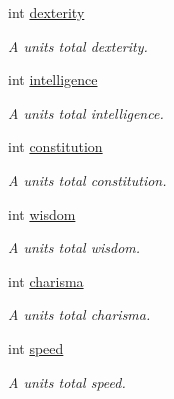 \begin{DoxyCompactItemize}
int \mbox{\hyperlink{class_attributes_ab0d80932c197709933e76e1a9faefcca}{dexterity}}
\begin{DoxyCompactList}\small\item\em A unit\textquotesingle{}s total dexterity. \end{DoxyCompactList}\item 
int \mbox{\hyperlink{class_attributes_a39014acfca0b4d854c675663a05b067e}{intelligence}}
\begin{DoxyCompactList}\small\item\em A unit\textquotesingle{}s total intelligence. \end{DoxyCompactList}\item 
int \mbox{\hyperlink{class_attributes_a5788ff85cda31bb47f02aa274d330523}{constitution}}
\begin{DoxyCompactList}\small\item\em A unit\textquotesingle{}s total constitution. \end{DoxyCompactList}\item 
int \mbox{\hyperlink{class_attributes_a48ec0beacd46bb9b9e206becde146d69}{wisdom}}
\begin{DoxyCompactList}\small\item\em A unit\textquotesingle{}s total wisdom. \end{DoxyCompactList}\item 
int \mbox{\hyperlink{class_attributes_ae5bf0d1820af23239997da36705a7295}{charisma}}
\begin{DoxyCompactList}\small\item\em A unit\textquotesingle{}s total charisma. \end{DoxyCompactList}\item 
int \mbox{\hyperlink{class_attributes_aa67231ed5d1163506d8d2d559a98e125}{speed}}
\begin{DoxyCompactList}\small\item\em A unit\textquotesingle{}s total speed. \end{DoxyCompactList}\item 

\end{DoxyCompactItemize}
